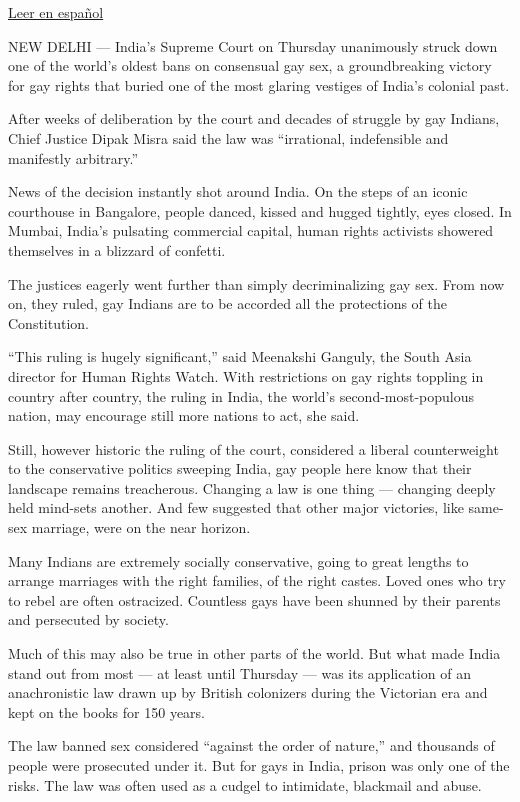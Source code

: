 \href{https://www.nytimes.com/es/2018/09/06/india-prohibicion-sexo-gay/}{Leer
en español}

NEW DELHI --- India's Supreme Court on Thursday unanimously struck down
one of the world's oldest bans on consensual gay sex, a groundbreaking
victory for gay rights that buried one of the most glaring vestiges of
India's colonial past.

After weeks of deliberation by the court and decades of struggle by gay
Indians, Chief Justice Dipak Misra said the law was ``irrational,
indefensible and manifestly arbitrary.''

News of the decision instantly shot around India. On the steps of an
iconic courthouse in Bangalore, people danced, kissed and hugged
tightly, eyes closed. In Mumbai, India's pulsating commercial capital,
human rights activists showered themselves in a blizzard of confetti.

The justices eagerly went further than simply decriminalizing gay sex.
From now on, they ruled, gay Indians are to be accorded all the
protections of the Constitution.

``This ruling is hugely significant,'' said Meenakshi Ganguly, the South
Asia director for Human Rights Watch. With restrictions on gay rights
toppling in country after country, the ruling in India, the world's
second-most-populous nation, may encourage still more nations to act,
she said.

Still, however historic the ruling of the court, considered a liberal
counterweight to the conservative politics sweeping India, gay people
here know that their landscape remains treacherous. Changing a law is
one thing --- changing deeply held mind-sets another. And few suggested
that other major victories, like same-sex marriage, were on the near
horizon.

Many Indians are extremely socially conservative, going to great lengths
to arrange marriages with the right families, of the right castes. Loved
ones who try to rebel are often ostracized. Countless gays have been
shunned by their parents and persecuted by society.

Much of this may also be true in other parts of the world. But what made
India stand out from most --- at least until Thursday --- was its
application of an anachronistic law drawn up by British colonizers
during the Victorian era and kept on the books for 150 years.

The law banned sex considered ``against the order of nature,'' and
thousands of people were prosecuted under it. But for gays in India,
prison was only one of the risks. The law was often used as a cudgel to
intimidate, blackmail and abuse.

